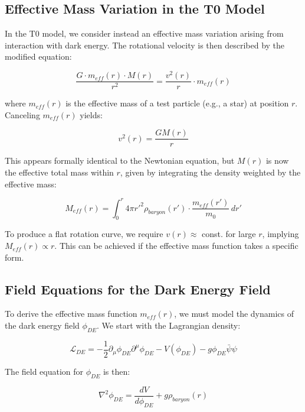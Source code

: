\documentclass[a4paper,12pt]{article}
\begin{document}
	\subsection{Effective Mass Variation in the T0 Model}
	
	In the T0 model, we consider instead an effective mass variation arising from interaction with dark energy. The rotational velocity is then described by the modified equation:
	
	\begin{equation}
		\frac{G \cdot m_{eff}(r) \cdot M(r)}{r^2} = \frac{v^2(r)}{r} \cdot m_{eff}(r)
	\end{equation}
	
	where $m_{eff}(r)$ is the effective mass of a test particle (e.g., a star) at position $r$. Canceling $m_{eff}(r)$ yields:
	
	\begin{equation}
		v^2(r) = \frac{GM(r)}{r}
	\end{equation}
	
	This appears formally identical to the Newtonian equation, but $M(r)$ is now the effective total mass within $r$, given by integrating the density weighted by the effective mass:
	
	\begin{equation}
		M_{eff}(r) = \int_0^r 4\pi r'^2 \rho_{baryon}(r') \cdot \frac{m_{eff}(r')}{m_0} \, dr'
	\end{equation}
	
	To produce a flat rotation curve, we require $v(r) \approx$ const. for large $r$, implying $M_{eff}(r) \propto r$. This can be achieved if the effective mass function takes a specific form.
	
	\subsection{Field Equations for the Dark Energy Field}
	
	To derive the effective mass function $m_{eff}(r)$, we must model the dynamics of the dark energy field $\phi_{DE}$. We start with the Lagrangian density:
	
	\begin{equation}
		\mathcal{L}_{DE} = -\frac{1}{2}\partial_\mu \phi_{DE} \partial^\mu \phi_{DE} - V(\phi_{DE}) - g\phi_{DE}\bar{\psi}\psi
	\end{equation}
	
	The field equation for $\phi_{DE}$ is then:
	
	\begin{equation}
		\nabla^2 \phi_{DE} = \frac{dV}{d\phi_{DE}} + g\rho_{baryon}(r)
	\end{equation}
	
\end{document}
